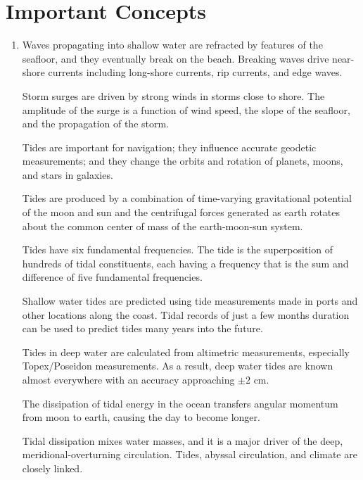 \section{Important Concepts}
\begin{enumerate}
\item Waves propagating into shallow water are refracted by features of
the seafloor, and they eventually break on the beach. Breaking waves
drive near-shore currents including long-shore currents, rip
currents, and edge waves.
  
\vitem Storm surges are driven by strong winds in storms close to
shore. The amplitude of the surge is a function of wind speed, the
slope of the seafloor, and the propagation of the storm.

\vitem Tides are important for navigation; they influence accurate
geodetic measurements; and they change the orbits and rotation of
planets, moons, and stars in galaxies.

\vitem Tides are produced by a combination of time-varying
gravitational potential of the moon and sun and the centrifugal forces
generated as earth rotates about the common center of mass of the
earth-moon-sun system.

\vitem Tides have six fundamental frequencies. The tide is the
superposition of hundreds of tidal constituents, each having a
frequency that is the sum and difference of five fundamental
frequencies.

\vitem Shallow water tides are predicted using tide measurements made
in ports and other locations along the coast. Tidal records of just a
few months duration can be used to predict tides many years into the
future.

\vitem Tides in deep water are calculated from altimetric
measurements, especially Topex/Poseidon
measurements. As a result, deep water tides are known almost
everywhere with an accuracy approaching $\pm 2$
cm.

\vitem The dissipation of tidal energy in the ocean transfers angular
momentum from moon to earth, causing the day to become
longer.

\vitem Tidal dissipation mixes water masses, and it is a major driver
of the deep, meridional-overturning
circulation. Tides, abyssal
circulation, and climate are closely linked.
\end{enumerate}

